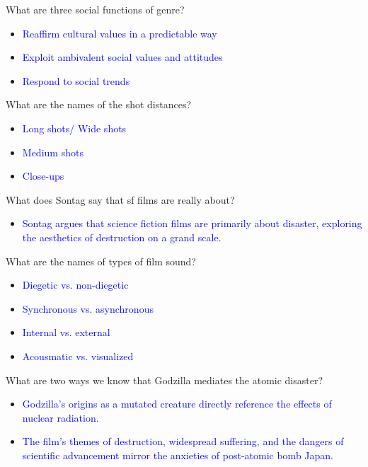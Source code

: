 \documentclass[11pt,fleqn]{book}
\begin{document}
\begin{exercise}
What are three social functions of genre?
\begin{itemize}
\item \textcolor{blue}{Reaffirm cultural values in a predictable way}
\item \textcolor{blue}{Exploit ambivalent social values and attitudes}
\item \textcolor{blue}{Respond to social trends}
\end{itemize}
\end{exercise}

\begin{exercise}
What are the names of the shot distances?
\begin{itemize}
\item \textcolor{blue}{Long shots/ Wide shots}
\item \textcolor{blue}{Medium shots}
\item \textcolor{blue}{Close-ups}
\end{itemize}
\end{exercise}

\begin{exercise}
What does Sontag say that sf films are really about?
\begin{itemize}
\item \textcolor{blue}{Sontag argues that science fiction films are primarily about disaster, exploring the aesthetics of destruction on a grand scale.}
\end{itemize}
\end{exercise}

\begin{exercise}
What are the names of types of film sound?
\begin{itemize}
\item \textcolor{blue}{Diegetic vs. non-diegetic}
\item \textcolor{blue}{Synchronous vs. asynchronous}
\item \textcolor{blue}{Internal vs. external}
\item \textcolor{blue}{Acousmatic vs. visualized}
\end{itemize}
\end{exercise}

\begin{exercise}
What are two ways we know that Godzilla mediates the atomic disaster?
\begin{itemize}
\item \textcolor{blue}{Godzilla's origins as a mutated creature directly reference the effects of nuclear radiation.}
\item \textcolor{blue}{The film's themes of destruction, widespread suffering, and the dangers of scientific advancement mirror the anxieties of post-atomic bomb Japan.}
\end{itemize}
\end{exercise}
\end{document}
